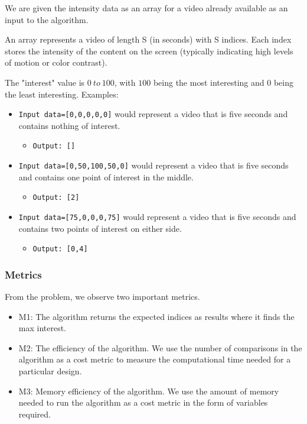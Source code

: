 \documentclass{article}
\begin{document}
We are given the intensity data as an array for a video already available as an input to the algorithm. 

An array represents a video of length S (in seconds) with S indices. Each index stores the intensity of the content on the screen (typically indicating high levels of motion or color contrast).

The "interest" value is $0~to~100$, with $100$ being the most interesting and $0$ being the least interesting. Examples:

\begin{itemize}
  \item \verb|Input data=[0,0,0,0,0]| would represent a video that is five seconds and contains nothing of interest. 
  \begin{itemize} 
    \item \verb|Output: []|
 \end{itemize}

 \item \verb|Input data=[0,50,100,50,0]| would represent a video that is five seconds and contains one point of interest in the middle. 
  \begin{itemize} 
    \item \verb|Output: [2]|
 \end{itemize}

 \item \verb|Input data=[75,0,0,0,75]| would represent a video that is five seconds and contains two points of interest on either side. 
  \begin{itemize} 
    \item \verb|Output: [0,4]|
 \end{itemize}
\end{itemize}


\subsubsection{Metrics}

From the problem, we observe two important metrics.

\begin{itemize}
  \item M1: The algorithm returns the expected indices as results where it finds the max interest.
  \item M2: The efficiency of the algorithm. We use the number of comparisons in the algorithm as a cost metric to measure the computational time needed for a particular design.
  \item M3: Memory efficiency of the algorithm. We use the amount of memory needed to run the algorithm as a cost metric in the form of variables required. 
\end{itemize}
\end{document}
